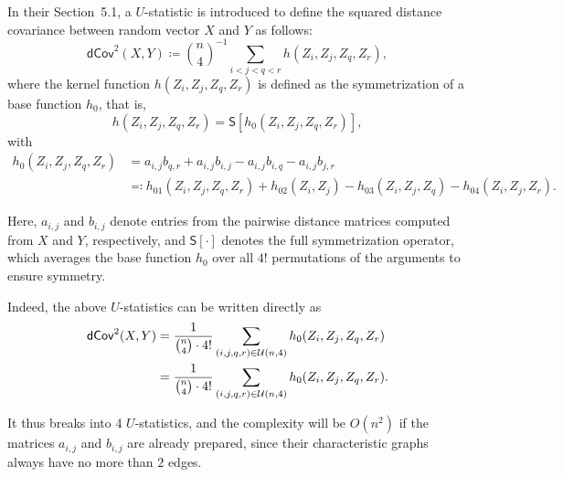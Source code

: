 \documentclass[letterpaper,11pt]{article}
\newcommand{\uset}{\calU}
\newcommand{\usetnm}[2]{\uset\left(#1,#2\right)}
\begin{document}
In their Section~5.1, a $U$-statistic is introduced to define the squared distance covariance between random vector $X$ and $Y$ as follows:
\begin{equation*}
    \mathsf{dCov}^2(X, Y) \coloneqq \binom{n}{4}^{-1} \sum_{i < j < q < r} h(Z_i, Z_j, Z_q, Z_r),
\end{equation*}
where the kernel function $h(Z_i, Z_j, Z_q, Z_r)$ is defined as the symmetrization of a base function $h_0$, that is,
\begin{equation*}
    h(Z_i, Z_j, Z_q, Z_r) = \mathsf{S}[h_0(Z_i, Z_j, Z_q, Z_r)],
\end{equation*}
with
\begin{align*}
    h_0(Z_i, Z_j, Z_q, Z_r) & = a_{i,j}b_{q,r} + a_{i,j}b_{i,j} - a_{i,j}b_{i,q} - a_{i,j}b_{j,r} \\
    & \eqqcolon h_{01}(Z_i, Z_j, Z_q, Z_r) + h_{02}(Z_i, Z_j) - h_{03}(Z_i, Z_j, Z_q) - h_{04}(Z_i, Z_j, Z_r).
\end{align*}

Here, $a_{i,j}$ and $b_{i,j}$ denote entries from the pairwise distance matrices computed from $X$ and $Y$, respectively, and $\mathsf{S}[\cdot]$ denotes the full symmetrization operator, which averages the base function $h_0$ over all $4!$ permutations of the arguments to ensure symmetry.

Indeed, the above $U$-statistics can be written directly as
\begin{align*}
    \mathsf{dCov}^2(X, Y) & = \frac{1}{\binom{n}{4} \cdot 4!} \sum_{(i,j,q,r) \in \usetnm{n}{4}} h_0(Z_i, Z_j, Z_q, Z_r) \\
    & = \frac{1}{\binom{n}{4} \cdot 4!} \sum_{(i,j,q,r) \in \usetnm{n}{4}} h_0(Z_i, Z_j, Z_q, Z_r).
\end{align*}

It thus breaks into 4 $U$-statistics, and the complexity will be $O(n^2)$ if the matrices $a_{i,j}$ and $b_{i,j}$ are already prepared, since their characteristic graphs always have no more than $2$ edges.
\end{document}
